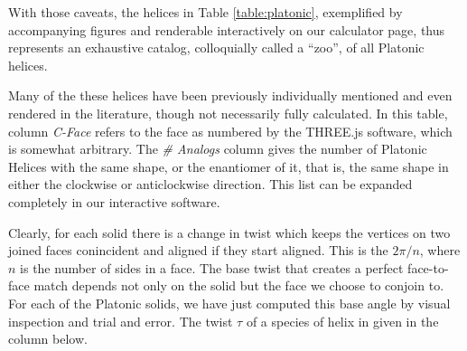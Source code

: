 \documentclass[11pt]{article}
\begin{document}
{With those caveats, the helices in Table \ref{table:platonic}, exemplified by
accompanying figures and renderable
interactively on our calculator page, thus represents an exhaustive catalog,
colloquially called a ``zoo'', of all Platonic helices.

Many of the these helices have been previously individually
mentioned and even rendered in the literature,
though not necessarily fully calculated.
In this table, column {\em C-Face} refers to the
face as numbered by the THREE.js software\cite{dirksen2013learning},
which is somewhat arbitrary. The {\em \# Analogs}
column gives the number of Platonic Helices with the same shape, or the enantiomer of it, that is, the same
shape in either the clockwise or anticlockwise direction. This list can be expanded completely in our interactive software.

Clearly, for each solid there is a change in twist which keeps the vertices on two joined faces conincident and
aligned if they start aligned. This is the $2\pi/n$,
where $n$ is the number of sides in a face. The base twist that creates
a perfect face-to-face match depends not only on the solid but the face we choose to conjoin to.
For each of the Platonic
solids, we have just computed this base angle by visual inspection and trial and error.
The twist $\tau$ of a species
of helix in given in the column below.

}
\end{document}
